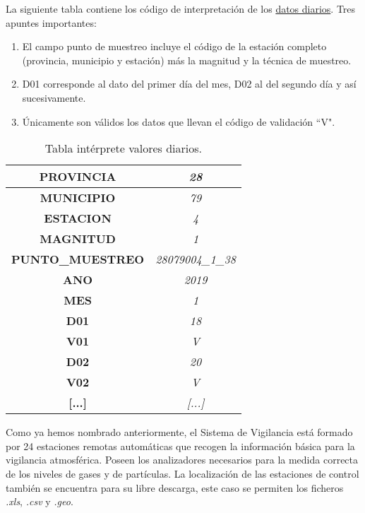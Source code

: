 La siguiente tabla contiene los código de interpretación de los \underline{datos diarios}. Tres apuntes importantes:

\begin{enumerate}
	\item El campo punto de muestreo incluye el código de la estación completo (provincia, municipio y estación) más la magnitud y la técnica de muestreo.
	
	\item D01 corresponde al dato del primer día del mes, D02 al del segundo día y así sucesivamente.
	
	\item Únicamente son válidos los datos que llevan el código de validación “V".
\end{enumerate}

\begin{table}[H]
	\begin{center}
		\begin{tabular}{|c|c|}
			\hline
			\textbf{PROVINCIA}       & \textit{28}              \\ \hline
			\textbf{MUNICIPIO}       & \textit{79}              \\ \hline
			\textbf{ESTACION}        & \textit{4}               \\ \hline
			\textbf{MAGNITUD}        & \textit{1}               \\ \hline
			\textbf{PUNTO\_MUESTREO} & \textit{28079004\_1\_38} \\ \hline
			\textbf{ANO}             & \textit{2019}            \\ \hline
			\textbf{MES}             & \textit{1}               \\ \hline
			\textbf{D01}             & \textit{18}              \\ \hline
			\textbf{V01}             & \textit{V}               \\ \hline
			\textbf{D02}             & \textit{20}              \\ \hline
			\textbf{V02}             & \textit{V}               \\ \hline
			\textbf{[...]}             & \textit{[...]}               \\ \hline
		\end{tabular}
	\caption{Tabla intérprete valores diarios.}
	\end{center}
\end{table}


Como ya hemos nombrado anteriormente, el Sistema de Vigilancia está formado por 24 estaciones remotas automáticas que recogen la información básica para la vigilancia atmosférica. Poseen los analizadores necesarios para la medida correcta de los niveles de gases y de partículas. La localización de las estaciones de control también se encuentra para su libre descarga, este caso se permiten los ficheros \textit{.xls}, \textit{.csv} y \textit{.geo}.  

